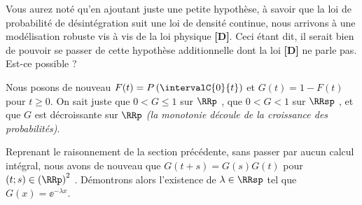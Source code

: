 Vous aurez noté qu'en ajoutant juste une petite hypothèse, à savoir que la loi de probabilité de désintégration suit une loi  de densité continue, nous arrivons à une modélisation robuste vis à vis de la loi physique \textbf{[D]}.
Ceci étant dit, il serait bien de pouvoir se passer de cette hypothèse additionnelle dont la loi \textbf{[D]} ne parle pas. Est-ce possible ?


\medskip


Nous posons de nouveau $F(t) = P\left( \intervalC{0}{t} \right)$ et $G(t) = 1 - F(t)$ pour $t \geq 0$. On sait juste que $0 < G \leq 1$ sur $\RRp$ , que $0 < G < 1$ sur $\RRsp$ , et que $G$ est décroissante sur $\RRp$ \emph{(la monotonie découle de la croissance des probabilités)}.


\medskip


Reprenant le raisonnement de la section précédente, sans passer par aucun calcul intégral, nous avons de nouveau que $G(t+s) = G(s) G(t)$ pour $(t ; s) \in \left( \RRp \right)^2$ .
Démontrons alors l'existence de $\lambda \in \RRsp$ tel que $G(x) = \ee^{-\lambda x}$.

